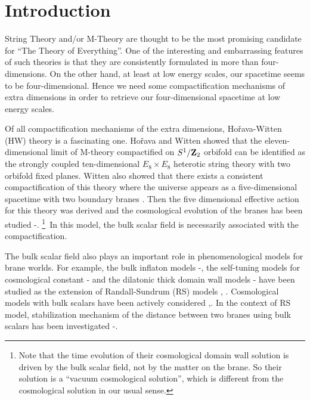 \documentclass[a4paper,11pt]{article}
\begin{document}
\newpage

\section{Introduction}

String Theory and/or M-Theory are thought to be the most promising 
candidate for ``The Theory of Everything''. One of the interesting 
and embarrassing features of such theories is that they are consistently 
formulated in more than four-dimensions. On the other hand, at least 
at low energy scales, our spacetime seems to be four-dimensional. 
Hence we need some compactification mechanisms of extra dimensions 
in order to retrieve our four-dimensional spacetime at low energy
scales. 
 
Of all compactification mechanisms of the extra dimensions, 
Ho\v{r}ava-Witten (HW) theory is a fascinating one\cite{HW1}\cite{HW2}. 
Ho\v{r}ava and Witten showed that the 
eleven-dimensional limit of M-theory compactified on $S^1/{\bf Z}_2$ 
orbifold can be identified as the strongly coupled ten-dimensional 
$E_8 \times E_8$ heterotic string theory with two orbifold fixed planes.  
Witten also showed that there exists a consistent compactification of this 
theory where the universe appears as a five-dimensional spacetime 
with two boundary branes \cite{Witten}. Then the five dimensional 
effective action for this theory was derived \cite{Lukas1} and 
the cosmological evolution of the branes has been studied 
\cite{Lukas2}-\cite{Reall}. \footnote{ 
Note that the time evolution of  their cosmological 
domain wall solution is driven by the bulk scalar field, 
not by the matter on the brane. So their solution is a ``vacuum 
cosmological solution'', which is different from the cosmological 
solution in our usual sense. }\ 
In this model, the bulk scalar field is necessarily associated with the 
compactification. 

The bulk scalar field 
also plays an important role in phenomenological models for brane worlds.
For example, the bulk inflaton models 
\cite{KKS}-\cite{SHS}, the self-tuning models for cosmological constant 
\cite{uzawa}-\cite{BCG} and the dilatonic thick domain wall models \cite{KKS2}
-\cite{CEHS} have been studied as the extension of
Randall-Sundrum (RS) models \cite{RS1}, \cite{RS2}. Cosmological models 
with bulk scalars have been actively considered \cite{LM},\cite{MB}. 
In the context of RS model, stabilization mechanism of the 
distance between two branes using bulk scalars has been 
investigated \cite{GW1}-\cite{CF}. 
\end{document}
